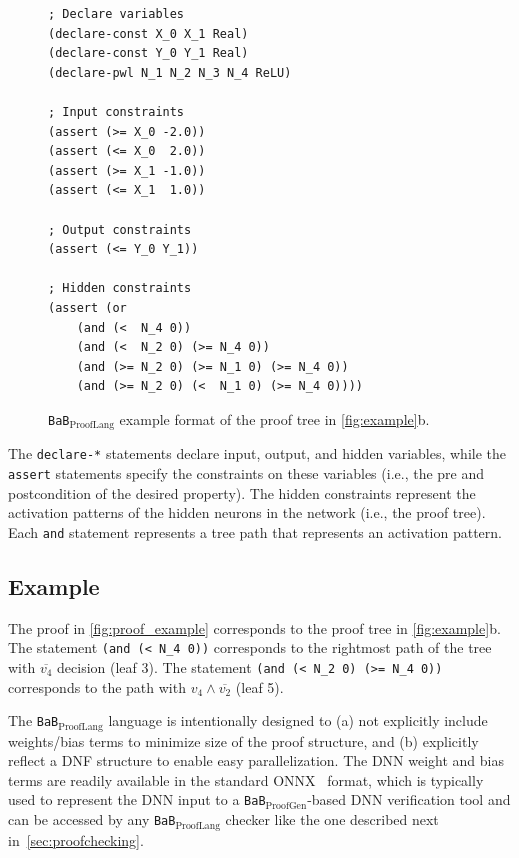 \documentclass[oneside,11pt,dvipsnames]{book}
\newcommand{\proofgen}{\texttt{BaB$_{\text{ProofGen}}$}}
\newcommand{\prooflang}{\texttt{BaB$_{\text{ProofLang}}$}}
\newcommand{\mycomment}[3][\color{blue}]{{#1{{#2}: {#3}}}}
\newcommand{\tvn}[1]{\mycomment{TVN}{#1}}{}
\begin{document}
\begin{figure}
\begin{lstlisting}[style=SMTLIB-style, language=SMTLIB, basicstyle=\ttfamily\scriptsize]
; Declare variables
(declare-const X_0 X_1 Real)
(declare-const Y_0 Y_1 Real)
(declare-pwl N_1 N_2 N_3 N_4 ReLU)

; Input constraints
(assert (>= X_0 -2.0))
(assert (<= X_0  2.0))
(assert (>= X_1 -1.0))
(assert (<= X_1  1.0))

; Output constraints
(assert (<= Y_0 Y_1)) 

; Hidden constraints
(assert (or 
    (and (<  N_4 0))
    (and (<  N_2 0) (>= N_4 0))
    (and (>= N_2 0) (>= N_1 0) (>= N_4 0))
    (and (>= N_2 0) (<  N_1 0) (>= N_4 0))))
\end{lstlisting}
\caption{\prooflang{} example format of the proof tree in \autoref{fig:example}b. 
}
\label{fig:proof_example}
\end{figure}


The \texttt{declare-*} statements declare input, output, and hidden variables, while the \texttt{assert} statements specify the constraints on these variables (i.e., the pre and postcondition of the desired property).
The hidden constraints represent the activation patterns of the hidden neurons in the network (i.e., the proof tree). Each \texttt{and} statement represents a tree path that represents an activation pattern. 



\subsection{Example} The proof in \autoref{fig:proof_example} corresponds to the proof tree in \autoref{fig:example}b. The statement \texttt{(and (< N\_4 0))} corresponds to the rightmost path of the tree with $\overline{v_4}$ decision (leaf 3).  The statement \texttt{(and (< N\_2 0) (>= N\_4 0))} corresponds to the path with $v_4 \land \overline{v_2}$ (leaf 5). 

The \prooflang{} language is intentionally designed to (a) not explicitly include weights/bias terms to minimize size of the proof structure, and (b) explicitly reflect a DNF structure to enable easy parallelization.
The DNN weight and bias terms are readily available in the standard ONNX~\cite{onnx} format, which is typically used to represent the DNN input to a \proofgen{}-based DNN verification tool and can be accessed by any \prooflang{} checker like the one described next in~\autoref{sec:proofchecking}.
\end{document}
